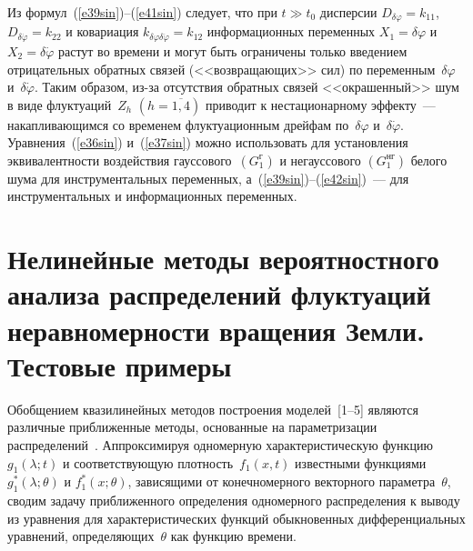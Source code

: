\begin{multicols}{2}
Из формул~(\ref{e39sin})--(\ref{e41sin}) следует, что при $t\gg t_0$ дисперсии $D_{\delta\varphi} =k_{11}$,
$ D_{\delta\dot\varphi} = k_{22}$ и ковариация $k_{\delta\varphi\delta\dot\varphi} = k_{12}$
информационных переменных $X_1=\delta \varphi$ и   $X_2=\delta \dot\varphi$  растут во времени и могут
быть ограничены только введением отрицательных
обратных связей (<<возвращающих>> сил) по переменным~$\delta \varphi$ и~$\delta \dot\varphi$.
Таким образом, из-за отсутствия обратных связей <<окрашенный>> шум в виде флуктуаций~$Z_h$ $(h=\overline{1,4})$
приводит к нестационарному эффекту~--- накапливающимся со временем флуктуационным дрейфам по~$\delta \varphi$ и~$\delta \dot\varphi$.
Уравнения~(\ref{e36sin}) и~(\ref{e37sin}) можно использовать для установления эквивалентности воздействия
гауссового~$(G_1^{\mathrm{г}})$ и негауссового $(G_1^{\mathrm{нг}})$ белого шума для инструментальных переменных,
а~(\ref{e39sin})--(\ref{e42sin})~--- для инструментальных и информационных переменных.

\vspace*{-4pt}
 
\section{Нелинейные методы вероятностного анализа распределений флуктуаций неравномерности вращения Земли. Тестовые примеры}

\vspace*{-1pt}

Обобщением квазилинейных методов построения моделей~[1--5] являются различные
приближенные методы, основанные на параметризации распределений~\cite{5sin, 7sin, 8sin}.
Аппроксимируя одно\-мерную характеристическую функцию~$g_1 (\lambda;t)$
и соответствующую плотность~$f_1 (x,t)$ известными функциями
$g_1^* (\lambda;\theta)$ и $f_1^* (x;\theta)$, зависящими от
конечномерного векторного параметра~$\theta$, сводим задачу
приближенного определения одномерного распределения к выводу из
уравнения для характеристических функций обыкновенных
дифференциальных уравнений, определяющих~$\theta$ как функцию времени.


\end{multicols}

